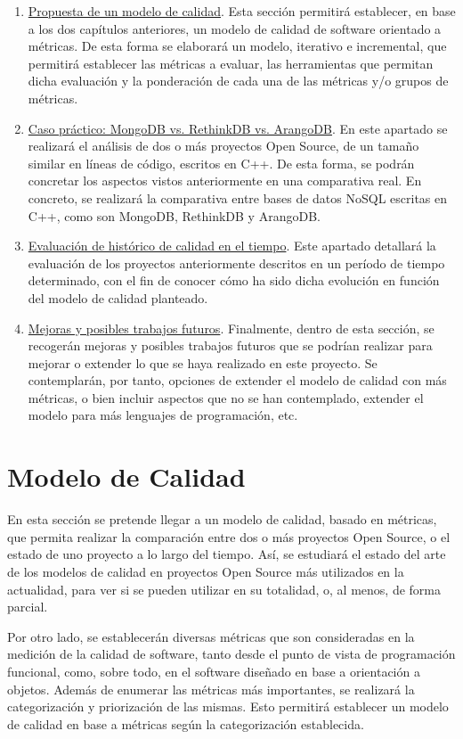 \documentclass[11pt]{article}
\begin{document}
\begin{enumerate}
\item{\underline{Propuesta de un modelo de calidad}}. Esta sección permitirá establecer, en base a los dos capítulos anteriores, un modelo de calidad de software orientado a métricas. De esta forma se elaborará un modelo, iterativo e incremental, que permitirá establecer las métricas a evaluar, las herramientas que permitan dicha evaluación y la ponderación de cada una de las métricas y/o grupos de métricas.
\item{\underline{Caso práctico: MongoDB vs. RethinkDB vs. ArangoDB}}. En este apartado se realizará el análisis de dos o más proyectos Open Source, de un tamaño similar en líneas de código, escritos en C++. De esta forma, se podrán concretar los aspectos vistos anteriormente en una comparativa real.
En concreto, se realizará la comparativa entre bases de datos NoSQL escritas en C++, como son MongoDB, RethinkDB y ArangoDB.
\item{\underline{Evaluación de histórico de calidad en el tiempo}}. Este apartado detallará la evaluación de los proyectos anteriormente descritos en un período de tiempo determinado, con el fin de conocer cómo ha sido dicha evolución en función del modelo de calidad planteado.
\item{\underline{Mejoras y posibles trabajos futuros}}. Finalmente, dentro de esta sección, se recogerán mejoras y posibles trabajos futuros que se podrían realizar para mejorar o extender lo que se haya realizado en este proyecto. Se contemplarán, por tanto, opciones de extender el modelo de calidad con más métricas, o bien incluir aspectos que no se han contemplado, extender el modelo para más lenguajes de programación, etc.
\end{enumerate}

\section{Modelo de Calidad}
En esta sección se pretende llegar a un modelo de calidad, basado en métricas, que permita realizar la comparación entre dos o más proyectos Open Source, o el estado de uno proyecto a lo largo del tiempo. Así, se estudiará el estado del arte de los modelos de calidad en proyectos Open Source más utilizados en la actualidad, para ver si se pueden utilizar en su totalidad, o, al menos, de forma parcial.

Por otro lado, se establecerán diversas métricas que son consideradas en la medición de la calidad de software, tanto desde el punto de vista de programación funcional, como, sobre todo, en el software diseñado en base a orientación a objetos. Además de enumerar las métricas más importantes, se realizará la categorización y priorización de las mismas. Esto permitirá establecer un modelo de calidad en base a métricas según la categorización establecida.
\end{document}
